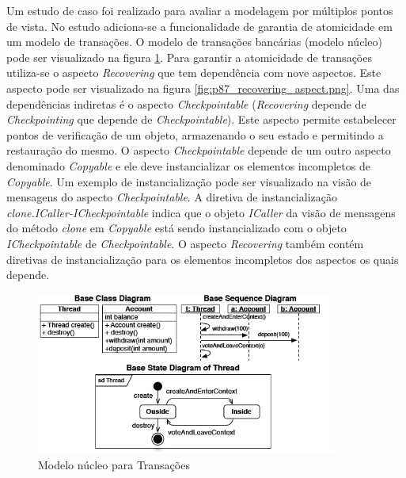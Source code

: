 Um estudo de caso foi realizado para avaliar a modelagem por múltiplos pontos de vista. No estudo adiciona-se a funcionalidade de garantia de
atomicidade em um modelo de transações. O modelo de transações bancárias (modelo núcleo) pode ser visualizado na figura \ref{fig:p87_base_model}. Para
garantir a atomicidade de transações utiliza-se o aspecto \textit{Recovering} que tem dependência com nove aspectos. Este aspecto pode ser visualizado 
na figura \ref{fig:p87_recovering_aspect.png}. Uma das dependências indiretas é o aspecto \textit{Checkpointable} (\textit{Recovering} depende de
\textit{Checkpointing} que depende de \textit{Checkpointable}). Este aspecto permite estabelecer pontos de verificação de um objeto, armazenando o seu estado e permitindo a restauração do mesmo. O aspecto \textit{Checkpointable} depende 
de um outro aspecto denominado \textit{Copyable} e ele deve instancializar os elementos incompletos de \textit{Copyable}. Um exemplo de
instancialização pode ser visualizado na visão de mensagens do aspecto \textit{Checkpointable}. A diretiva de instancialização \textit{clone.ICaller-ICheckpointable} 
indica que o objeto \textit{ICaller} da visão de mensagens do método \textit{clone} em \textit{Copyable} está sendo instancializado com o objeto
\textit{ICheckpointable} de \textit{Checkpointable}. O aspecto \textit{Recovering} também contém diretivas de instancialização para os elementos 
incompletos dos aspectos os quais depende.

\begin{figure}
	\centering
	\includegraphics[width=375px]{img/p87_base_model.png}
	\caption{Modelo núcleo para Transações}\label{fig:p87_base_model}
\end{figure}

